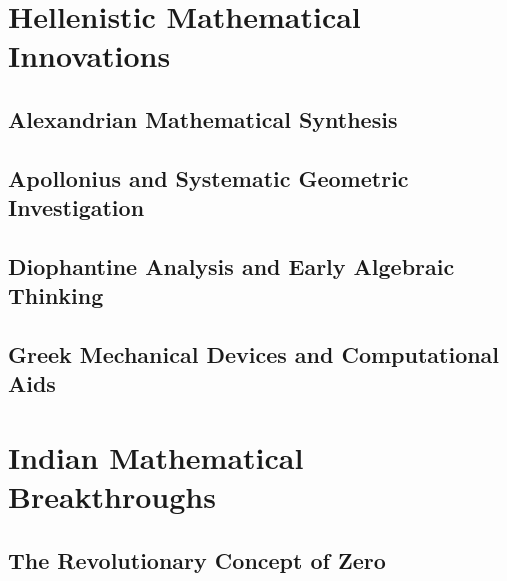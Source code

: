 \documentclass[12pt, oneside, openany]{book}
\begin{document}

\chapter{Hellenistic Mathematical Innovations}

\section{Alexandrian Mathematical Synthesis}

\section{Apollonius and Systematic Geometric Investigation}

\section{Diophantine Analysis and Early Algebraic Thinking}

\section{Greek Mechanical Devices and Computational Aids}


\chapter{Indian Mathematical Breakthroughs}

\section{The Revolutionary Concept of Zero}
\end{document}

